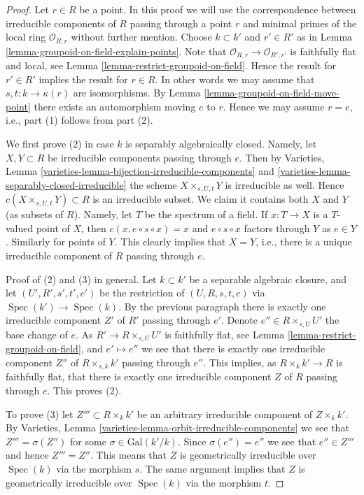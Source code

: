 \documentclass{stacks-project}
\theoremstyle{plain}
\theoremstyle{definition}
\theoremstyle{remark}
\numberwithin{equation}{subsection}
\def\Spec{\mathop{\mathrm{Spec}}}
\begin{document}
\begin{proof}
Let $r \in R$ be a point.
In this proof we will use the correspondence between irreducible components
of $R$ passing through a point $r$ and minimal primes of the local
ring $\mathcal{O}_{R, r}$ without further mention.
Choose $k \subset k'$ and $r' \in R'$ as in
Lemma \ref{lemma-groupoid-on-field-explain-points}.
Note that $\mathcal{O}_{R, r} \to \mathcal{O}_{R', r'}$
is faithfully flat and local, see
Lemma \ref{lemma-restrict-groupoid-on-field}.
Hence the result for $r' \in R'$ implies the result for $r \in R$.
In other words we may assume that $s, t : k \to \kappa(r)$
are isomorphisms. By
Lemma \ref{lemma-groupoid-on-field-move-point}
there exists an automorphism moving $e$ to $r$.
Hence we may assume $r = e$, i.e., part (1) follows from part (2).

\medskip\noindent
We first prove (2) in case $k$ is separably algebraically closed.
Namely, let $X, Y \subset R$ be irreducible components
passing through $e$. Then by
Varieties, Lemma \ref{varieties-lemma-bijection-irreducible-components} and
\ref{varieties-lemma-separably-closed-irreducible}
the scheme $X \times_{s, U, t} Y$ is irreducible as well.
Hence $c(X \times_{s, U, t} Y) \subset R$ is an irreducible subset.
We claim it contains both $X$ and $Y$ (as subsets of $R$).
Namely, let $T$ be the spectrum of a field. If $x : T \to X$ is a $T$-valued
point of $X$, then $c(x, e \circ s \circ x) = x$ and $e \circ s \circ x$
factors through $Y$ as $e \in Y$. Similarly for points of $Y$.
This clearly implies that $X = Y$, i.e., there is a unique irreducible
component of $R$ passing through $e$.

\medskip\noindent
Proof of (2) and (3) in general.
Let $k \subset k'$ be a separable algebraic closure, and
let $(U', R', s', t', c')$ be the restriction of
$(U, R, s, t, c)$ via $\Spec(k') \to \Spec(k)$.
By the previous paragraph there is exactly one irreducible
component $Z'$ of $R'$ passing through $e'$.
Denote $e'' \in R \times_{s, U} U'$ the base change of $e$.
As $R' \to R \times_{s, U} U'$ is faithfully flat, see
Lemma \ref{lemma-restrict-groupoid-on-field},
and $e' \mapsto e''$ we see that there is exactly one
irreducible component $Z''$ of $R \times_{s, k} k'$ passing
through $e''$. This implies, as $R \times_k k' \to R$ is faithfully
flat, that there is exactly one irreducible component $Z$ of $R$
passing through $e$. This proves (2).

\medskip\noindent
To prove (3) let $Z''' \subset R \times_k k'$ be an arbitrary
irreducible component of $Z \times_k k'$. By
Varieties, Lemma \ref{varieties-lemma-orbit-irreducible-components}
we see that $Z''' = \sigma(Z'')$ for some $\sigma \in \text{Gal}(k'/k)$.
Since $\sigma(e'') = e''$ we see that $e'' \in Z'''$ and hence
$Z''' = Z''$. This means that $Z$ is geometrically irreducible
over $\Spec(k)$ via the morphism $s$.
The same argument implies that $Z$ is geometrically irreducible
over $\Spec(k)$ via the morphism $t$.
\end{proof}
\end{document}

